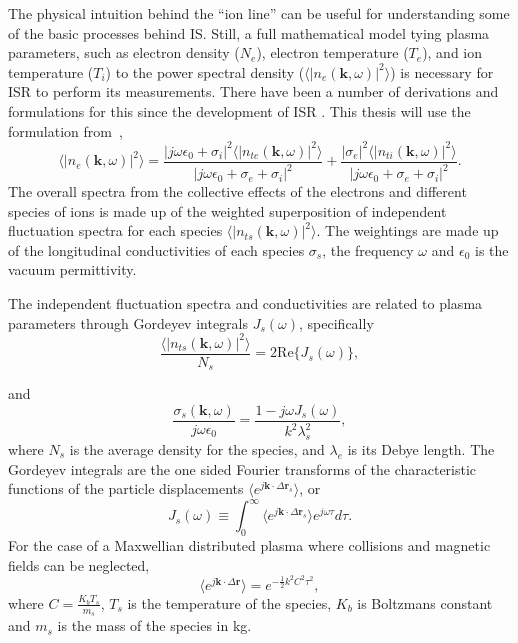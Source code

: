 The physical intuition behind the ``ion line'' can be useful for understanding some of the basic processes behind IS. Still, a full mathematical model tying plasma parameters, such as electron density ($N_e$), electron temperature ($T_e$),  and ion temperature ($T_i$) to the power spectral density ($\langle \left|n_e(\mathbf{k},\omega)\right|^2\rangle$) is necessary for ISR to perform its measurements. There have been a number of derivations and formulations for this since the development of ISR \citep{dougherty:farley1960,farleydougherty:ISR2,doughteryfarley:ISR3,hagfors1961}. This thesis will use the formulation from~\citet{Kudeki:2006kx,kudeki:milla:1,kudeki:milla:2},
\begin{equation}
\label{eq:mainspeceq:body}
\langle \left|n_e(\mathbf{k},\omega)\right|^2\rangle = \frac{|j\omega\epsilon_0 + \sigma_i|^2 \langle |n_{te}(\mathbf{k},\omega)|^2\rangle}{|j\omega\epsilon_0 +\sigma_e+\sigma_i|^2} + \frac{| \sigma_e|^2 \langle |n_{ti}(\mathbf{k},\omega)|^2\rangle}{|j\omega\epsilon_0 +\sigma_e+\sigma_i|^2}.
\end{equation}
The overall spectra from the collective effects of the electrons and different species of ions is made up of the weighted superposition of independent fluctuation spectra for each species $\langle |n_{ts}(\mathbf{k},\omega)|^2\rangle$. The weightings are made up of the longitudinal conductivities of each species $\sigma_s$, the frequency $\omega$ and $\epsilon_0$ is the vacuum permittivity. 

The independent fluctuation spectra and conductivities are related to plasma parameters through Gordeyev integrals $J_s(\omega)$, specifically 
\begin{equation}
\label{eq:thermalfl:bod}
\frac{\langle|n_{ts}(\mathbf{k},\omega)|^2\rangle}{N_s} = 2\text{Re}\{J_s(\omega)\},
\end{equation}

\noindent and 
\begin{equation}
\label{eq:cond:bod}
\frac{\sigma_{s}(\mathbf{k},\omega)}{j\omega\epsilon_0} = \frac{1-j\omega J_s(\omega)}{k^2\lambda_s^2},
\end{equation}
where $N_s$ is the average density for the species, and $\lambda_{e}$ is its Debye length. The Gordeyev integrals are the one sided Fourier transforms of the characteristic functions of the particle displacements $\langle e^{j\mathbf{k}\cdot\Delta\mathbf{r}_s}\rangle$, or  
\begin{equation}
\label{eq:gord:body}
J_s(\omega)\equiv \int_0^\infty \langle e^{j\mathbf{k}\cdot\Delta \mathbf{r}_s}\rangle e^{j\omega\tau}d\tau.
\end{equation}
For the case of a Maxwellian distributed plasma where collisions and magnetic fields can be neglected,
 \begin{equation}
\label{eq:pdfallc2}
\langle e^{j\mathbf{k}\cdot\Delta \mathbf{r}}\rangle= e^{-\frac{1}{2}k^2C^2 \tau^2},
\end{equation}
where $C=\frac{K_bT_s}{m_s}$, $T_s$ is the temperature of the species, $K_b$ is Boltzmans constant and $m_s$ is the mass of the species in kg.

